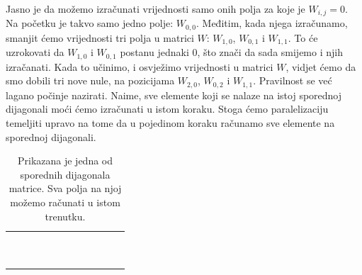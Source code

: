 \documentclass[times, utf8, zavrsni]{fer}
\begin{document}
Jasno je da možemo izračunati vrijednosti samo onih polja
za koje je $W_{i,j}=0$. Na početku je takvo samo jedno polje:
$W_{0,0}$. Međitim, kada njega izračunamo, smanjit ćemo
vrijednosti tri polja u matrici $W$: $W_{1,0}$, $W_{0,1}$ i
$W_{1,1}$. To će uzrokovati da $W_{1,0}$ i $W_{0,1}$ postanu
jednaki $0$, što znači da sada smijemo i njih izračanati.
Kada to učinimo, i osvježimo vrijednosti u matrici $W$, 
vidjet ćemo da smo dobili tri nove nule, na pozicijama
$W_{2,0}$, $W_{0,2}$ i $W_{1,1}$. Pravilnost se već
lagano počinje nazirati. Naime, sve elemente koji 
se nalaze na istoj sporednoj dijagonali moći ćemo 
izračunati u istom koraku. Stoga ćemo paralelizaciju
temeljiti upravo na tome da u pojedinom koraku
računamo sve elemente na sporednoj dijagonali. 

\begin{table}
\centering
\begin{tabularx}{240pt}{|R|R|R|R|R|R|R|R|R|R|R|R|}
 \hline
  &  &  &  &  &  &  &  &  &   &  &  \\ \hline
  &  &  &  &  &  &  &  &   &  &  &  \\ \hline
  &  &  &  &  &  &  &   &  &  &  &  \\ \hline
  &  &  &  &  &  &   &  &  &  &  &  \\ \hline
  &  &  &  &  &   &  &  &  &  &  &  \\ \hline
  &  &  &  &   &  &  &  &  &  &  &  \\ \hline
  &  &  &   &  &  &  &  &  &  &  &  \\ \hline
  &  &   &  &  &  &  &  &  &  &  &  \\ \hline
  &   &  &  &  &  &  &  &  &  &  &  \\ \hline
   &  &  &  &  &  &  &  &  &  &  &  \\ \hline
  &  &  &  &  &  &  &  &  &  &  &  \\ \hline
\end{tabularx}
\caption[Prikaz sporedne dijagonale]{Prikazana je jedna od sporednih
dijagonala matrice. Sva polja na njoj možemo računati u istom trenutku.}
\label{table:impl:dijagonala}
\end{table}
\end{document}
